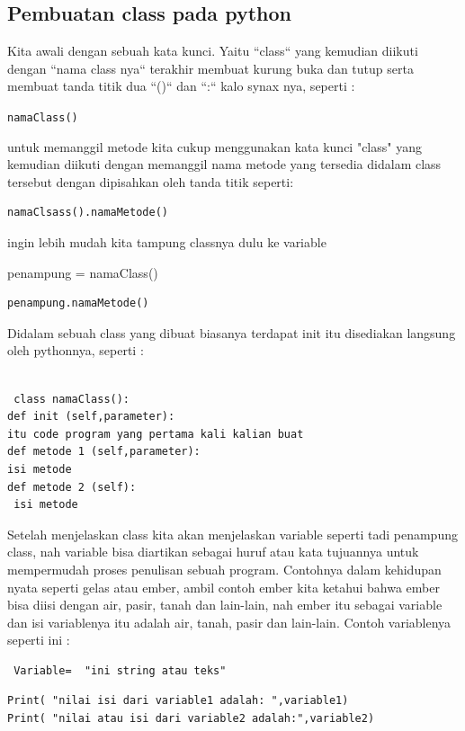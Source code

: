 \subsection{Pembuatan class pada python}
Kita awali dengan sebuah kata kunci. Yaitu ``class`` yang kemudian diikuti dengan ``nama class nya`` terakhir membuat kurung buka dan tutup serta membuat tanda titik dua  ``()`` dan ``:`` kalo synax nya, seperti :


\verb|namaClass()|

untuk memanggil metode kita cukup menggunakan kata kunci "class" yang kemudian diikuti dengan memanggil nama metode yang tersedia didalam class tersebut dengan dipisahkan oleh tanda titik seperti:
\begin{verbatim}
namaClsass().namaMetode()
\end{verbatim}
ingin lebih mudah kita tampung classnya dulu ke variable

penampung = namaClass()
\begin{verbatim}
penampung.namaMetode()
\end{verbatim}

Didalam sebuah class yang dibuat biasanya terdapat init itu disediakan langsung oleh pythonnya, seperti :


\begin{verbatim}

 class namaClass():
def init (self,parameter):
itu code program yang pertama kali kalian buat
def metode 1 (self,parameter):
isi metode
def metode 2 (self):
 isi metode

 \end{verbatim}

Setelah menjelaskan class kita akan menjelaskan variable seperti tadi penampung class, nah variable bisa diartikan sebagai huruf atau kata tujuannya untuk mempermudah proses penulisan sebuah program. Contohnya dalam kehidupan nyata seperti gelas atau ember, ambil contoh ember kita ketahui bahwa ember bisa diisi dengan air, pasir, tanah dan lain-lain, nah ember itu sebagai variable dan isi variablenya itu adalah air, tanah, pasir dan lain-lain.
Contoh variablenya seperti ini :

\begin{verbatim}
 Variable=  "ini string atau teks"
\end{verbatim}

\begin{verbatim}
Print( "nilai isi dari variable1 adalah: ",variable1)
Print( "nilai atau isi dari variable2 adalah:",variable2)
\end{verbatim}

